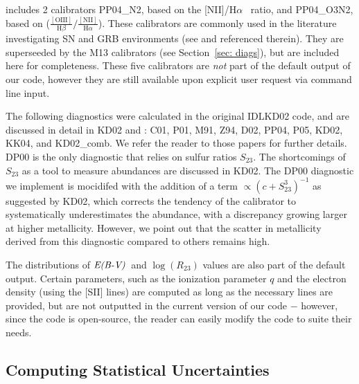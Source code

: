 \documentclass{emulateapj} \usepackage{amsmath} \usepackage{float}
\newcommand{\ha}{\ensuremath{\mathrm{H}\alpha}}
\newcommand{\hb}{\ensuremath{\mathrm{H}\beta}}
\newcommand{\ebmv}{\ensuremath{\mathrm{\emph{E(B-V)}}}}
\begin{document}
\begin{itemize}
  \citep{pettini04} includes 2 calibrators PP04\_N2, based on the
        [NII]/\ha~ ratio, and PP04\_O3N2, based on
        ($\frac{\mathrm{[OIII]}}{\hb}/\frac{\mathrm{[NII]}}{\ha}$).
        These calibrators are commonly used in the literature investigating
        SN and GRB environments (see \citealt{modjaz11} and referenced
        therein). They are superseeded by the M13 calibrators (see
        Section~\ref{sec: diags}), but are included here for
        completeness.  These five calibrators are \emph{not} part of
        the default output of our code, however they are still
        available upon explicit user request via command line input.

\end{itemize}

The following diagnostics were calculated in the original IDLKD02
code, and are discussed in detail in KD02 and
\citet{kewley08}: C01, P01, M91, Z94, D02, PP04, P05, KD02, KK04, and
KD02\_comb. We refer the reader to those papers for further details. DP00 is the only diagnostic that relies on sulfur ratios $S_{23}$.
The shortcomings of $S_{23}$ as a tool to measure abundances are
discussed in KD02.
The DP00 diagnostic we implement is mocidifed with the addition of a
term $\propto (c+S_{23}^3)^{-1}$ as suggested by KD02,
which corrects the tendency of the calibrator to systematically
underestimates the abundance, with a discrepancy growing larger at
higher metallicity. However, we point out that the scatter in
metallicity derived from this diagnostic compared to others remains
high.

The distributions of \ebmv~and $\log(R_{23})$ values are also part of
the default output. Certain parameters, such as the ionization
parameter $q$ and the electron density (using the [SII] lines) are
computed as long as the necessary lines are provided, but are not
outputted in the current version of our code $-$ however, since the
code is open-source, the reader can easily modify the code to suite
their needs.



\subsection{Computing Statistical Uncertainties}\label{sec:uncert}
\end{document}
